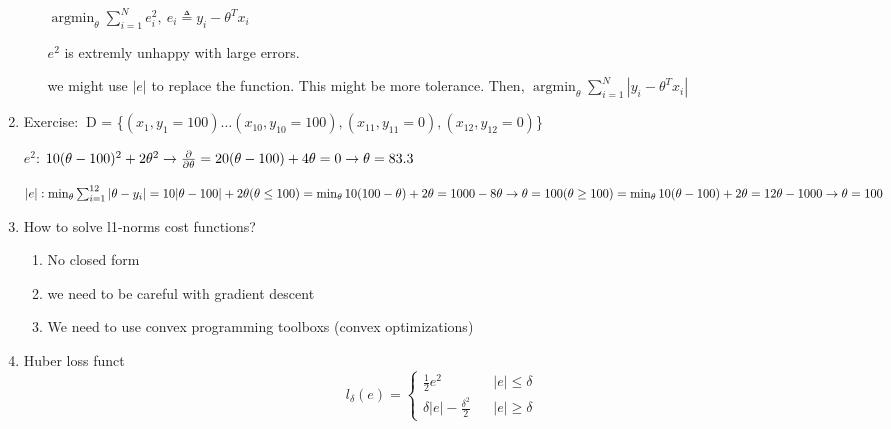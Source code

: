 \documentclass[12pt]{article}
\newcommand{\exe}{{\color{green} Exercise: $\ $}}
\DeclareMathOperator*{\argmin}{\arg\min}
\begin{document}
\begin{multicols}{2}
\begin{enumerate}
\begin{enumerate}
                $\argmin_{\theta} \sum_{i = 1}^{N} e_i^2, \ e_i \triangleq y_i - \theta^T x_i$

                $e^2$ is extremly unhappy with large errors.

                we might use $|e|$ to replace the function. This might be more tolerance. Then, $\argmin_{\theta} \sum_{i = 1}^N |y_i - \theta^T x_i|$
            \end{enumerate}
            
            \item \exe D = \{$(x_1, y_1 = 100) \dots (x_10, y_10 = 100), (x_{11}, y_{11} = 0),  (x_{12}, y_{12} = 0)$\}
            
            $e^2$: $10(\theta - 100)^2 + 2\theta^2 \rightarrow \\ \frac{\partial}{\partial \theta} = 20(\theta - 100) + 4\theta = 0 \rightarrow \\ \theta = 83.3$

            $|e|: \min_{\theta} \sum_{i = 1}^{12} |\theta - y_i|  = 10| \theta - 100 | + 2\theta \\
             (\theta \le 100) = \min_{\theta} 10(100 - \theta) + 2\theta \\
             = 1000 - 8\theta \rightarrow \theta = 100\\
             (\theta \ge 100) = \min_{\theta} 10(\theta - 100) + 2\theta \\
             = 12\theta - 1000 \rightarrow \theta = 100 $
            
             \item How to solve l1-norms cost functions?
             
             \begin{enumerate}
                 \item No closed form
                 \item we need to be careful with gradient descent
                 \item We need to use convex programming toolboxs (convex optimizations)
             \end{enumerate}

             \item Huber loss funct
             $$
                l_{\delta} (e) = \left\{ 
                    \begin{array}{rcl}
                        \frac{1}{2}e^2 & & |e| \le \delta \\
                        \delta |e| - \frac{{\delta}^2}{2} & & |e| \ge \delta
                    \end{array} 
                    \right.
             $$


\end{enumerate}
\end{multicols}
\end{document}
